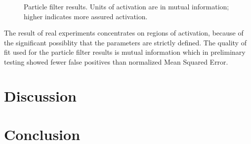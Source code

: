 \documentclass[journal]{./IEEEtran}
\begin{document}
\begin{figure}
\centering
{}
\caption{Particle filter results. Units of activation are in mutual information; higher
    indicates more assured activation.}
\label{fig:hm_canon_spm}
\end{figure}

The result of real experiments concentrates on regions of activation, because
of the significant possiblity that the parameters are strictly defined. The
quality of fit used for the particle filter results is mutual information which
in preliminary testing showed fewer false positives than normalized Mean Squared
Error. 

\section{Discussion}
\label{sec:Discussion}

\section{Conclusion}
\label{sec:Conclusion}

\end{document}
